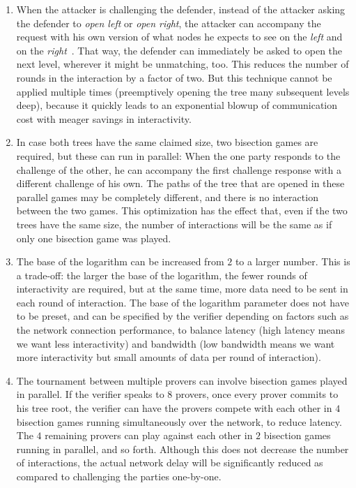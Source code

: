 \begin{enumerate}
\item When the attacker is challenging
the defender, instead of the attacker asking the defender to \emph{open left} or \emph{open right},
the attacker can accompany the request with his own version of what nodes he expects to see on the
\emph{left} and on the \emph{right}~\cite{inside-arbitrum}.
That
way, the defender can immediately be asked to open the next level, wherever it might be unmatching,
too. This reduces the number of
rounds in the interaction by a factor of two. But this technique cannot be applied multiple times
(preemptively opening the tree many subsequent levels deep), because
it quickly leads to an exponential blowup of communication cost with meager savings in interactivity.
\item In case both trees have the same
claimed size, two bisection games are required, but these can run in parallel: When the one party responds to the challenge
of the other, he can accompany the first challenge response with a different challenge of his own. The paths of the
tree that are opened in these parallel games may be completely different, and there is no interaction between
the two games. This optimization has the effect
that, even if the two trees have the same size, the number of interactions will be the same as if
only one bisection game was played.
\item The base of the logarithm can be increased from $2$ to
a larger number. This is a trade-off: the larger the base of the logarithm, the fewer rounds of
interactivity are required, but at the same time, more data need to be sent in each round of interaction.
The base of the logarithm parameter does not have to be preset, and can be specified by the verifier
depending on factors such as the network connection performance, to balance latency (high latency
means we want less interactivity) and bandwidth (low bandwidth means we want more interactivity
but small amounts of data per round of interaction).
\item The tournament
between multiple provers can involve bisection games played in parallel. If the verifier speaks to $8$
provers, once every prover commits to his tree root, the verifier can have the provers compete with
each other in $4$ bisection games running simultaneously over the network, to reduce latency.
The $4$ remaining provers can play against each other in $2$ bisection games running in parallel,
and so forth. Although this does not decrease the number of interactions, the actual network delay
will be significantly reduced as compared to challenging the parties one-by-one.
\end{enumerate}

